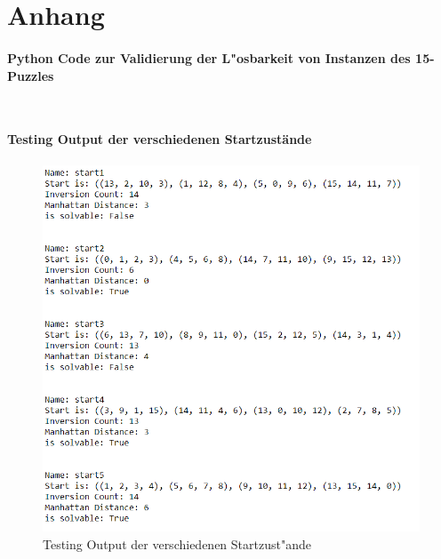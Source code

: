 \chapter{Anhang}


\subsubsection{Python Code zur Validierung der L"osbarkeit von Instanzen des 15-Puzzles}
\label{ssec:appendix-latency-benchmark}
\begin{lstlisting}[caption={Python Code zur Validierung der L"osbarkeit von Instanzen des 15-Puzzles}, label={code:validate-15-puzzle:py}]
\end{lstlisting}
\inputminted[linenos,breaklines,breakanywhere]{python}{../code/15-solvable-v1.py}
\newpage

\subsubsection{Testing Output der verschiedenen Startzust\"ande}
\begin{figure}[H]
    \centering
    \includegraphics[width=\linewidth,keepaspectratio]{img/testing_output.PNG}
    \captionsetup{format=plain, indention=0pt}
    \caption{Testing Output der verschiedenen Startzust"ande \label{app:fig:testing-output}}
\end{figure}